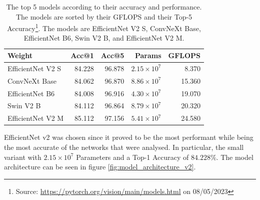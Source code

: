 \begin{table}[ht]
  \caption[Top 5 models for Accuracy and Performance]{The top 5 models according to their accuracy and performance. The models are sorted by their GFLOPS and their Top-5 Accuracy\footnote{Source: \url{https://pytorch.org/vision/main/models.html} on 08/05/2023}. The models are EfficientNet V2 S, ConvNeXt Base, EfficientNet B6, Swin V2 B, and EfficientNet V2 M.}
  \label{tab:network_comparison}
  \centering
  \begin{tabular}{lrrrr}
    \hline
            Weight &  Acc@1 &  Acc@5 &   Params &  GFLOPS \\
    \hline
  EfficientNet V2 S & 84.228 & 96.878 & $2.15 \times 10^7$ &   8.370 \\
      ConvNeXt Base & 84.062 & 96.870 & $8.86 \times 10^7$ &  15.360 \\
    EfficientNet B6 & 84.008 & 96.916 & $4.30 \times 10^7$ &  19.070 \\
          Swin V2 B & 84.112 & 96.864 & $8.79 \times 10^7$ &  20.320 \\
  EfficientNet V2 M & 85.112 & 97.156 & $5.41 \times 10^7$ &  24.580 \\
  \hline
  \end{tabular}
\end{table}

EfficientNet v2 was chosen since it proved to be the most performant while being the most accurate of the networks that were analysed. In particular, the small variant with $2.15 \times 10^7$ Parameters and a Top-1 Accuracy of $84.228\%$. The model architecture can be seen in figure \ref{fig:model_architecture_v2}.